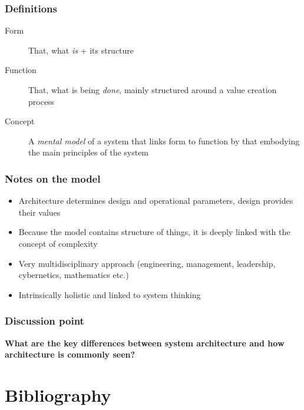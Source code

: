 \begin{frame}[fragile]
  \frametitle{Definitions}
	\begin{description}
		\item[Form] That, what \emph{is} + its structure
		\item[Function] That, what is being \emph{done}, mainly structured around a value creation process
		\item[Concept] A \emph{mental model} of a system that links form to function by that embodying the main principles of the system
	\end{description}
\end{frame}

\begin{frame}[fragile]
  \frametitle{Notes on the model}
	\begin{itemize}
		\item Architecture determines design and operational parameters, design provides their values
		\item Because the model contains structure of things, it is deeply linked with the concept of complexity
		\item Very multidisciplinary approach (engineering, management, leadership, cybernetics, mathematics etc.)
		\item Intrinsically holistic and linked to system thinking
	\end{itemize}
\end{frame}

\begin{frame}[fragile]
  \frametitle{Discussion point}
		\begin{center}
			\textbf{What are the key differences between system architecture and how architecture is commonly seen?}
		\end{center}
\end{frame}

\section{Bibliography}

\begin{frame}[t,allowframebreaks,]
  	
	 

\end{frame}

